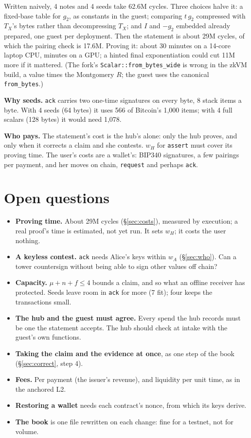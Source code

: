 \documentclass[11pt]{article}
\theoremstyle{plain}
\theoremstyle{definition}
\newcommand{\tx}[1]{\texttt{#1}}
\begin{document}
Written naively, 4 notes and 4 seeds take 62.6M cycles. Three choices
halve it: a fixed-base table for $g_2$, as constants in the guest;
comparing $t\,g_2$ compressed with $T_X$'s bytes rather than
decompressing $T_X$; and $I$ and $-g_2$ embedded already prepared, one
guest per deployment. Then the statement is about 29M cycles, of which
the pairing check is 17.6M. Proving it: about 30 minutes on a 14-core
laptop CPU, minutes on a GPU; a hinted final exponentiation could cut
11M more if it mattered. (The fork's \tx{Scalar::from\_bytes\_wide} is
wrong in the zkVM build, a value times the Montgomery $R$; the guest
uses the canonical \tx{from\_bytes}.)

\textbf{Why seeds.} \tx{ack} carries two one-time signatures on every
byte, 8 stack items a byte. With 4 seeds (64 bytes) it uses 566 of
Bitcoin's 1,000 items; with 4 full scalars (128 bytes) it would need
1,078.

\textbf{Who pays.} The statement's cost is the hub's alone: only the
hub proves, and only when it corrects a claim and she contests. $w_H$
for \tx{assert} must cover its proving time. The user's costs are a
wallet's: BIP340 signatures, a few pairings per payment, and her moves
on chain, \tx{request} and perhaps \tx{ack}.

\section{Open questions}\label{sec:open}

\begin{itemize}[nosep]
\item \textbf{Proving time.} About 29M cycles (\S\ref{sec:costs}),
  measured by execution; a real proof's time is estimated, not yet
  run. It sets $w_H$; it costs the user nothing.
\item \textbf{A keyless contest.} \tx{ack} needs Alice's keys within
  $w_A$ (\S\ref{sec:who}). Can a tower countersign without being able
  to sign other values off chain?
\item \textbf{Capacity.} $\mu + n + f \le 4$ bounds a claim, and so what
  an offline receiver has protected. Seeds leave room in \tx{ack} for
  more (7 fit); four keeps the transactions small.
\item \textbf{The hub and the guest must agree.} Every spend the hub
  records must be one the statement accepts. The hub should check at
  intake with the guest's own functions.
\item \textbf{Taking the claim and the evidence at once}, as one step
  of the book (\S\ref{sec:correct}, step 4).
\item \textbf{Fees.} Per payment (the issuer's revenue), and liquidity
  per unit time, as in the anchored L2.
\item \textbf{Restoring a wallet} needs each contract's nonce, from
  which its keys derive.
\item \textbf{The book} is one file rewritten on each change: fine for a
  testnet, not for volume.
\end{itemize}
\end{document}
